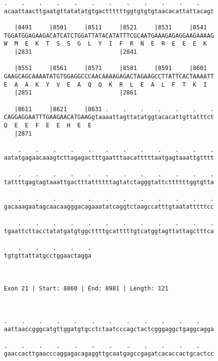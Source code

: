 \documentclass{article}
\begin{document}
\begin{Verbatim}
.    .    .    .    .    .    .    .    .    .    .    .    
acaattaacttgaatgttatatatgtgacttttttggtgtgtgtaacacattattacagt
                                                            
   |8491     |8501     |8511     |8521     |8531     |8541  
TGGATGGAGAAGACATCATCTGGATTATACATATTTCGCAATGAAAGAGAGGAAGAAAAG
W  M  E  K  T  S  S  G  L  Y  I  F  R  N  E  R  E  E  E  K  
   |2831                         |2841                      
  
   |8551     |8561     |8571     |8581     |8591     |8601  
GAAGCAGCAAAATATGTGGAGGCCCAACAAAAGAGACTAGAAGCCTTATTCACTAAAATT
E  A  A  K  Y  V  E  A  Q  Q  K  R  L  E  A  L  F  T  K  I  
   |2851                         |2861                      
  
   |8611     |8621     |8631 .    .    .    .    .    .    .
CAGGAGGAATTTGAAGAACATGAAGgtaaaattagttatatggtacacattgttatttct
Q  E  E  F  E  E  H  E  E                                   
   |2871                                                    
  
    .    .    .    .    .    .    .    .    .    .    .    .
aatatgagaacaaagtcttagagactttgaatttaacatttttaatgagtaaattgtttt
                                                            
    .    .    .    .    .    .    .    .    .    .    .    .
tattttgagtagtaaattgactttattttttagtatctagggtattcttttttggtgtta
                                                            
    .    .    .    .    .    .    .    .    .    .    .    .
gacaaagaatagcaacaagggacagaaatatcaggtctaagccatttgtaatatttttcc
                                                            
    .    .    .    .    .    .    .    .    .    .    .    .
tgaattcttacctatatgatgtggcttttgcatttttgtcatggtagttattagctttca
                                                            
    .    .    .    .    .
tgtgttattatgcctggaactagga
                         
                         
 
Exon 21 | Start: 8860 | End: 8981 | Length: 121



.    .    .    .    .    .    .    .    .    .    .    .    
aattaaccgggcatgttggatgtgcctctaatcccagctactcgggaggctgaggcagga
                                                            
.    .    .    .    .    .    .    .    .    .    .    .    
gaaccacttgaacccaggagacagaggttgcaatgagccgagatcacaccactgcactcc
                                                            

\end{Verbatim}
\end{document}
